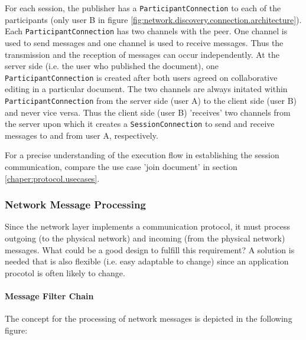 For each session, the publisher has a \texttt{ParticipantConnection} to each of the participants (only user B in figure \ref{fig:network.discovery.connection.architecture}). Each \texttt{ParticipantConnection} has two channels with the peer. One channel is used to send messages and one channel is used to receive messages. Thus the transmission and the reception of messages can occur independently. At the server side (i.e. the user who published the document), one \texttt{ParticipantConnection} is created after both users agreed on collaborative editing in a particular document. The two channels are always initated within \texttt{ParticipantConnection} from the server side (user A) to the client side (user B) and never vice versa. Thus the client side (user B) 'receives' two channels from the server upon which it creates a \texttt{SessionConnection} to send and receive messages to and from user A, respectively.

For a precise understanding of the execution flow in establishing the session communication, compare the use case 'join document' in section \ref{chaper:protocol.usecases}.


\subsubsection{Network Message Processing}
Since the network layer implements a communication protocol, it must process outgoing (to the physical network) and incoming (from the physical network) messages. What could be a good design to fulfill this requirement? A solution is needed that is also flexible (i.e. easy adaptable to change) since an application procotol is often likely to change.

\paragraph{Message Filter Chain}
\label{chapter:network.protocol.messagefilterchain}
The concept for the processing of network messages is depicted in the following figure:

